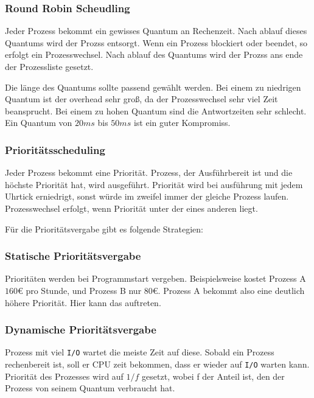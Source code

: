 \subsubsection{Round Robin Scheudling}

Jeder Prozess bekommt ein gewisses Quantum an Rechenzeit. Nach ablauf dieses
Quantums wird der Prozss entsorgt. Wenn ein Prozess blockiert oder beendet, so
erfolgt ein Prozesswechsel. Nach ablauf des Quantums wird der Prozss ans ende
der Prozessliste gesetzt.

Die länge des Quantums sollte passend gewählt werden. Bei einem zu niedrigen
Quantum ist der overhead sehr groß, da der Prozesswechsel sehr viel Zeit
beansprucht. Bei einem zu hohen Quantum sind die Antwortzeiten sehr schlecht.
Ein Quantum von $20ms$ bis $50ms$ ist ein guter Kompromiss.

\subsubsection{Prioritätsscheduling}

Jeder Prozess bekommt eine Priorität. Prozess, der Ausführbereit ist und die
höchste Priorität hat, wird ausgeführt. Priorität wird bei ausführung mit jedem
Uhrtick erniedrigt, sonst würde im zweifel immer der gleiche Prozess laufen.
Prozesswechsel erfolgt, wenn Priorität unter der eines anderen liegt.

Für die Prioritätsvergabe gibt es folgende Strategien:

\subsubsection*{Statische Prioritätsvergabe}

Prioritäten werden bei Programmstart vergeben. Beispielsweise kostet Prozess A
$160$€ pro Stunde, und Prozess B nur $80$€. Prozess A bekommt also eine
deutlich höhere Priorität. Hier kann das 
auftreten.

\subsubsection*{Dynamische Prioritätsvergabe}

Prozess mit viel \texttt{I/O} wartet die meiste Zeit auf diese. Sobald ein
Prozess rechenbereit ist, soll er CPU zeit bekommen, dass er wieder auf
\texttt{I/O} warten kann. Priorität des Prozesses wird auf $1 / f$ gesetzt,
wobei f der Anteil ist, den der Prozess von seinem Quantum verbraucht hat.


